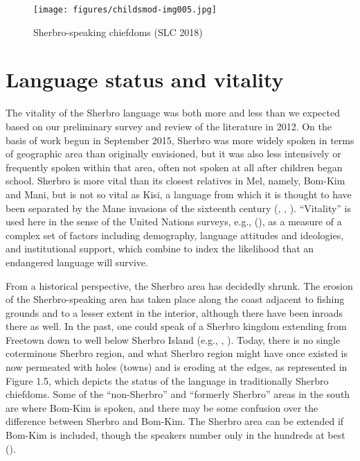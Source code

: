 \begin{figure}
\caption{Sherbro-speaking chiefdoms ({SLC 2018})}
\label{fig:intro:5}
\texttt{[image: figures/childsmod-img005.jpg]}
\end{figure}

\section{Language status and vitality} 
\label{sec:1.7}\hypertarget{Toc115517749}{}
The vitality of the Sherbro language was both more and less than we expected based on our preliminary survey and review of the literature in 2012. On the basis of work begun in  {September 2015}, Sherbro was more widely spoken in terms of geographic area than originally envisioned, but it was also less intensively or frequently spoken within that area, often not spoken at all after children began school. Sherbro is more vital than its closest relatives in Mel, namely, Bom-Kim and Mani, but is not so vital as Kisi, a language from which it is thought to have been separated by the Mane invasions of the sixteenth century (\citealt{Childs1995}, \citealt{Rodney1967}, \citealt{Rodney1970}). “Vitality” is used here in the sense of the United Nations surveys, e.g., (\citealt{UNESCOAdHocExpertGrouponEndangeredLanguages2003}), as a measure of a complex set of factors including demography, language attitudes and ideologies, and institutional support, which combine to index the likelihood that an endangered language will survive.

From a historical perspective, the Sherbro area has decidedly shrunk. The erosion of the Sherbro-speaking area has taken place along the coast adjacent to fishing grounds and to a lesser extent in the interior, although there have been inroads there as well. In the past, one could speak of a Sherbro kingdom extending from Freetown down to well below Sherbro Island (e.g., \citealt{Abraham2003},  \citealt{Alie1990}). Today, there is no single coterminous Sherbro region, and what Sherbro region might have once existed is now permeated with holes (towns) and is eroding at the edges, as represented in Figure 1.5, which depicts the status of the language in traditionally Sherbro chiefdoms. Some of the “non-Sherbro” and “formerly Sherbro” areas in the south are where Bom-Kim is spoken, and there may be some confusion over the difference between Sherbro and Bom-Kim. The Sherbro area can be extended if Bom-Kim is included, though the speakers number only in the hundreds at best (\citealt{Childs2020}).

